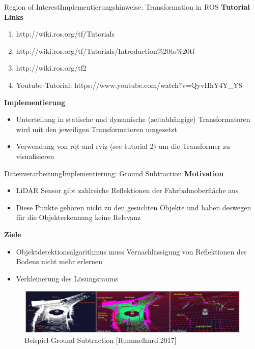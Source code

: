 \documentclass[169, handout	]{THIbeamer} %
\begin{document}
	\begin{frame}{Region of Interest}{Implementierungshinweise: Transformation in ROS}	
		\footnotesize
		\textbf{Tutorial Links}
		\begin{enumerate}
			\item http://wiki.ros.org/tf/Tutorials
			\item http://wiki.ros.org/tf/Tutorials/Introduction\%20to\%20tf
			\item http://wiki.ros.org/tf2
			\item Youtube-Tutorial: https://www.youtube.com/watch?v=QyvHhY4Y\_Y8
		\end{enumerate}
		\textbf{Implementierung}
		\begin{itemize}
			\item Unterteilung in statische und dynamische (zeitabhängige) Transformatoren wird mit den jeweiligen Transformatoren umgesetzt
			\item Verwendung von rqt and rviz (see tutorial 2) um die Transformer zu visualisieren
		\end{itemize}

	\end{frame}
	\begin{frame}{Datenverarbeitung}{Implementierung: Ground Subtraction}
		\footnotesize
		\textbf{Motivation}
		\begin{itemize}
			\item LiDAR Sensor gibt zahlreiche Reflektionen der Fahrbahnoberfläche aus
			\item Diese Punkte gehören nicht zu den gesuchten Objekte und haben deswegen für die Objekterkennung keine Relevanz \\
		\end{itemize}
		\textbf{Ziele}
		\begin{itemize}
			\item Objektdetektionsalgorithmus muss Vernachlässigung von Reflektionen des Bodens nicht mehr erlernen
			\item Verkleinerung des Lösungsraums  
		\end{itemize}	
		\begin{figure}
			\includegraphics[scale=0.4]{required/Ground Subtraction.jpg}
			\caption{Beispiel Ground Subtraction [Rummelhard.2017]}
        	\label{Ground Subtraction}
       	\end{figure}
	\end{frame}
\end{document}
